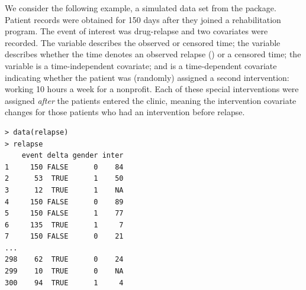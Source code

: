 \documentclass[article]{jss}
\begin{document}
We consider the following example, a simulated data set from the  package. Patient records were obtained for 150 days after they joined a rehabilitation program. The event of interest was drug-relapse and two covariates were recorded. The  variable describes the observed or censored time; the  variable describes whether the time denotes an observed relapse () or a censored time; the  variable is a time-independent covariate; and  is a time-dependent covariate indicating whether the patient was (randomly) assigned a second intervention: working 10 hours a week for a nonprofit. Each of these special interventions were assigned \emph{after} the patients entered the clinic, meaning the intervention covariate changes for those patients who had an intervention before relapse.
\begin{verbatim}
> data(relapse)
> relapse
    event delta gender inter
1     150 FALSE      0    84
2      53  TRUE      1    50
3      12  TRUE      1    NA
4     150 FALSE      0    89
5     150 FALSE      1    77
6     135  TRUE      1     7
7     150 FALSE      0    21
...
298    62  TRUE      0    24
299    10  TRUE      0    NA
300    94  TRUE      1     4
\end{verbatim}
\end{document}
